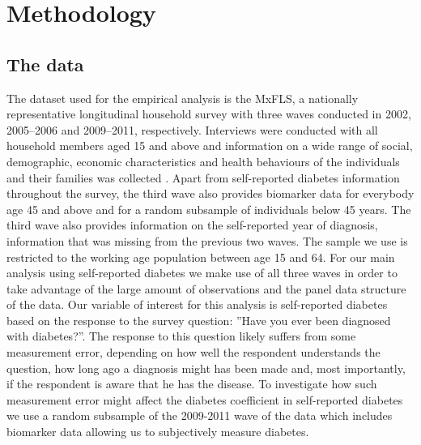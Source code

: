 \section{\noindent \label{sec:Methodology}Methodology}
\subsection{\noindent \label{sec:Data}The data}
The dataset used for the empirical analysis is the \acf{MxFLS}, a nationally representative longitudinal household survey with three waves conducted in 2002, 2005--2006 and 2009--2011, respectively.
Interviews were conducted with all household members aged 15 and above
and information on a wide range of social, demographic, economic characteristics
and health behaviours of the individuals and their families was collected
\citep{Rubalcava2013}. Apart from self-reported diabetes information
throughout the survey, the third wave also provides biomarker data
for everybody age 45 and above and for a random subsample of individuals
below 45 years. The third wave also provides information on the self-reported
year of diagnosis, information that was missing from the previous
two waves. The sample we use is restricted to the working age population
between age 15 and 64. For our main analysis using self-reported diabetes
we make use of all three waves in order to take advantage of the large
amount of observations and the panel data structure of the data. Our variable of interest for this analysis is self-reported diabetes based on the response to the survey question: ''Have
you ever been diagnosed with diabetes?''. The response to this question
likely suffers from some measurement error, depending on how well
the respondent understands the question, how long ago
a diagnosis might has been made and, most importantly, if the respondent is aware that he has the disease. To investigate how such measurement error might affect the diabetes coefficient in self-reported diabetes we use a random subsample of the 2009-2011 wave of the data which includes biomarker data allowing us to subjectively measure diabetes.

  
  
  
  
  
  
  
  
  
  
  
  
  
  
  
  
  
  
  
  
  
  
  
  
  
  
  
  
  
  
  
  
  
  